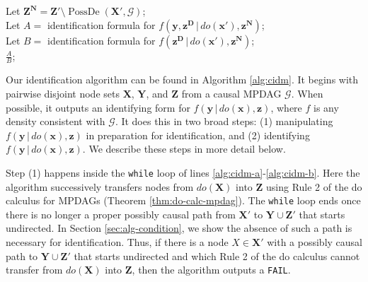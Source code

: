 \documentclass[11pt]{article}
\DeclareMathOperator{\PossDe}{PossDe}
\newcommand{\mb}[1]{\mathbf{#1}}
\newcommand{\g}[1][G]{\mathcal{#1}}
\begin{document}
\begin{algorithm}[t]
{        Let $\mb{Z^N} = \mb{Z'} \setminus \PossDe(\mb{X'}, \g)$;\label{alg:cidm-f}\\
        Let $A =$ identification formula for $f(\mb{y},\mb{z^{\scriptscriptstyle{D}}} \,|\, do(\mb{x'}), \mb{z^{\scriptscriptstyle{N}}})$;\label{alg:cidm-g}%
            \hspace*{3.6em}%
            \\
        Let $B =$ identification formula for $f(\mb{z^{\scriptscriptstyle{D}}} \,|\, do(\mb{x'}), \mb{z^{\scriptscriptstyle{N}}})$;\label{alg:cidm-h}\\
        \Return $\frac{A}{B}$;\label{alg:cidm-i}
    }
\caption{Conditional Identification for MPDAGs (\texttt{CIDM})}
\label{alg:cidm}
\end{algorithm} 


Our identification algorithm can be found in Algorithm \ref{alg:cidm}. It begins with pairwise disjoint node sets $\mb{X}$, $\mb{Y}$, and $\mb{Z}$ from a causal MPDAG $\g$. When possible, it outputs an identifying form for $f(\mb{y} \,|\, do(\mb{x}), \mb{z})$, where $f$ is any density consistent with $\g$. It does this in two broad steps: (1) manipulating $f(\mb{y} \,|\, do(\mb{x}), \mb{z})$ in preparation for identification, and (2) identifying $f(\mb{y} \,|\, do(\mb{x}), \mb{z})$. We describe these steps in more detail below.

Step (1) happens inside the \texttt{while} loop of lines \ref{alg:cidm-a}-\ref{alg:cidm-b}. Here the algorithm successively transfers nodes from $do(\mb{X})$ into $\mb{Z}$ using Rule 2 of the do calculus for MPDAGs (Theorem \ref{thm:do-calc-mpdag}). The \texttt{while} loop ends once there is no longer a proper possibly causal path from $\mb{X'}$ to $\mb{Y} \cup \mb{Z'}$ that starts undirected. In Section \ref{sec:alg-condition}, we show the absence of such a path is necessary for identification. Thus, if there is a node $X \in \mb{X'}$ with a possibly causal path to $\mb{Y} \cup \mb{Z'}$ that starts undirected and which Rule 2 of the do calculus cannot transfer from $do(\mb{X})$ into $\mb{Z}$, then the algorithm outputs a \texttt{FAIL}.
\end{document}
